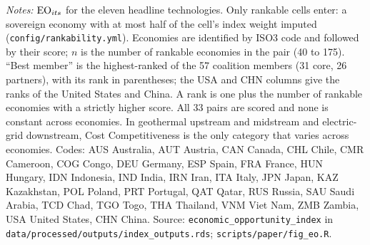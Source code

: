 \begin{table}[tbp]
\begin{threeparttable}
\begin{tablenotes}[flushleft]
\item \textit{Notes:} $\mathrm{EO}_{its}$ for the eleven headline technologies. Only rankable cells enter: a sovereign economy with at most half of the cell's index weight imputed (\texttt{config/rankability.yml}). Economies are identified by ISO3 code and followed by their score; $n$ is the number of rankable economies in the pair (40 to 175). ``Best member'' is the highest-ranked of the 57 coalition members (31 core, 26 partners), with its rank in parentheses; the USA and CHN columns give the ranks of the United States and China. A rank is one plus the number of rankable economies with a strictly higher score. All 33 pairs are scored and none is constant across economies. In geothermal upstream and midstream and electric-grid downstream, Cost Competitiveness is the only category that varies across economies. Codes: AUS Australia, AUT Austria, CAN Canada, CHL Chile, CMR Cameroon, COG Congo, DEU Germany, ESP Spain, FRA France, HUN Hungary, IDN Indonesia, IND India, IRN Iran, ITA Italy, JPN Japan, KAZ Kazakhstan, POL Poland, PRT Portugal, QAT Qatar, RUS Russia, SAU Saudi Arabia, TCD Chad, TGO Togo, THA Thailand, VNM Viet Nam, ZMB Zambia, USA United States, CHN China. Source: \texttt{economic\_opportunity\_index} in \texttt{data/processed/outputs/index\_outputs.rds}; \texttt{scripts/paper/fig\_eo.R}.
\end{tablenotes}
\end{threeparttable}
\end{table}

